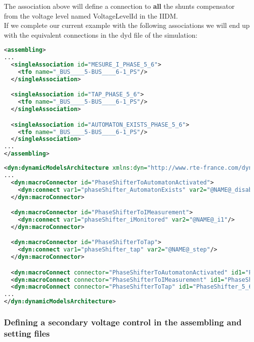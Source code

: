 \documentclass[a4paper, 12pt]{report}
\begin{document}
The association above will define a connection to \textbf{all} the shunts compensator from the voltage level named VoltageLevelId in the IIDM. \\

If we complete our current example with the following associations we will end up with the equivalent connections in the dyd file of the \Dynawo simulation:
 \begin{lstlisting}[language=XML, breaklines=true, breakatwhitespace=false, columns=fullflexible]
<assembling>
...
  <singleAssociation id="MESURE_I_PHASE_5_6">
    <tfo name="_BUS____5-BUS____6-1_PS"/>
  </singleAssociation>

  <singleAssociation id="TAP_PHASE_5_6">
    <tfo name="_BUS____5-BUS____6-1_PS"/>
  </singleAssociation>

  <singleAssociation id="AUTOMATON_EXISTS_PHASE_5_6">
    <tfo name="_BUS____5-BUS____6-1_PS"/>
  </singleAssociation>
...
</assembling>
\end{lstlisting}

\begin{lstlisting}[language=XML, breaklines=true, breakatwhitespace=false, columns=fullflexible]
<dyn:dynamicModelsArchitecture xmlns:dyn="http://www.rte-france.com/dynawo">
...
  <dyn:macroConnector id="PhaseShifterToAutomatonActivated">
    <dyn:connect var1="phaseShifter_AutomatonExists" var2="@NAME@_disable_internal_tapChanger"/>
  </dyn:macroConnector>

  <dyn:macroConnector id="PhaseShifterToIMeasurement">
    <dyn:connect var1="phaseShifter_iMonitored" var2="@NAME@_i1"/>
  </dyn:macroConnector>

  <dyn:macroConnector id="PhaseShifterToTap">
    <dyn:connect var1="phaseShifter_tap" var2="@NAME@_step"/>
  </dyn:macroConnector>

  <dyn:macroConnect connector="PhaseShifterToAutomatonActivated" id1="PhaseShifter_5_6" id2="NETWORK" index1="0" name2="_BUS____5-BUS____6-1_PS"/>
  <dyn:macroConnect connector="PhaseShifterToIMeasurement" id1="PhaseShifter_5_6" id2="NETWORK" index1="0" name2="_BUS____5-BUS____6-1_PS"/>
  <dyn:macroConnect connector="PhaseShifterToTap" id1="PhaseShifter_5_6" id2="NETWORK" index1="0" name2="_BUS____5-BUS____6-1_PS"/>
...
</dyn:dynamicModelsArchitecture>
\end{lstlisting}


\subsubsection{Defining a secondary voltage control in the assembling and setting files}
\end{document}
